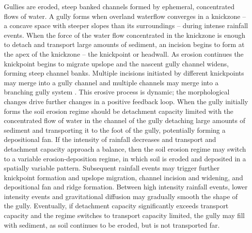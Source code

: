 \documentclass[gmd, manuscript]{copernicus}
\begin{document}
Gullies are eroded, steep banked channels 
formed by ephemeral, concentrated flows of water.
A gully forms when overland waterflow
converges in a knickzone
-- a concave space with steeper slopes than its surroundings 
\citep{Zahra2017} -- 
during intense rainfall events.  
When the force of the water flow concentrated in the knickzone
is enough to detach and transport large amounts of sediment,
an incision begins to form at the apex of the knickzone 
-- the knickpoint or headwall.
As erosion continues the knickpoint begins to migrate upslope
and the nascent gully channel widens,
forming steep channel banks. 
Multiple incisions initiated by different knickpoints 
may merge into a gully channel
and multiple channels may merge 
into a branching gully system \citep{Mitasova2013}. 
This erosive process is dynamic; 
the morphological changes drive further changes 
in a positive feedback loop.
When the gully initially forms 
the soil erosion regime should be detachment capacity limited
with the concentrated flow of water in the channel of the gully 
detaching large amounts of sediment 
and transporting it to the foot of the gully, 
potentially forming a depositional fan.
If the intensity of rainfall decreases
and transport and detachment capacity 
approach a balance, 
then the soil erosion regime may switch to 
a variable erosion-deposition regime,
in which soil is eroded and deposited 
in a spatially variable pattern.
% 
Subsequent rainfall events may trigger further 
knickpoint formation and upslope migration, 
channel incision and widening, and
depositional fan and ridge formation. 
Between high intensity rainfall events, 
lower intensity events and gravitational diffusion
may gradually smooth the shape of the gully. 
Eventually, if detachment capacity 
significantly exceeds transport capacity
and the regime switches to transport capacity limited, 
the gully may fill with sediment,
as soil continues to be eroded, but is not transported far. 
\end{document}
